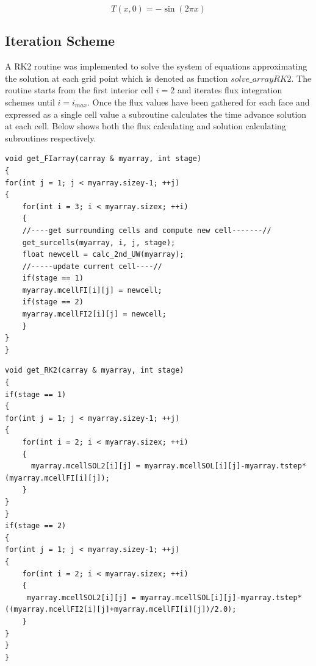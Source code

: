 \documentclass[paper=a4, fontsize=11pt, abstract=on]{scrartcl}
\numberwithin{equation}{section}		%
\numberwithin{figure}{section}			%
\numberwithin{table}{section}				%
\begin{document}
 \begin{equation}
\label{int}
T(x,0) = -\sin{(2\pi x)}
\end{equation}
  
\subsection{Iteration Scheme}
A RK2 routine was implemented to solve the system of equations approximating the solution at each grid point which is denoted as function $solve\_ arrayRK2$. The routine starts from the first interior cell $i = 2$ and iterates flux integration schemes until $i = i_{max}$. Once the flux values have been gathered for each face and expressed as a single cell value a subroutine calculates the time advance solution at each cell. Below shows both the flux calculating and solution calculating subroutines respectively.

\begin{lstlisting}
void get_FIarray(carray & myarray, int stage)
{
for(int j = 1; j < myarray.sizey-1; ++j)
{
    for(int i = 3; i < myarray.sizex; ++i)
    {
    //----get surrounding cells and compute new cell-------//
    get_surcells(myarray, i, j, stage);
    float newcell = calc_2nd_UW(myarray); 
    //-----update current cell----//
    if(stage == 1)
    myarray.mcellFI[i][j] = newcell;
    if(stage == 2)
    myarray.mcellFI2[i][j] = newcell;
    }
}
}
\end{lstlisting}
\begin{lstlisting}
void get_RK2(carray & myarray, int stage)
{
if(stage == 1)
{
for(int j = 1; j < myarray.sizey-1; ++j)
{
    for(int i = 2; i < myarray.sizex; ++i)
    {
      myarray.mcellSOL2[i][j] = myarray.mcellSOL[i][j]-myarray.tstep*(myarray.mcellFI[i][j]);
    }
}
}
if(stage == 2)
{
for(int j = 1; j < myarray.sizey-1; ++j)
{
    for(int i = 2; i < myarray.sizex; ++i)
    {
     myarray.mcellSOL2[i][j] = myarray.mcellSOL[i][j]-myarray.tstep*((myarray.mcellFI2[i][j]+myarray.mcellFI[i][j])/2.0);
    }
}
}
}
\end{lstlisting}
\end{document}
